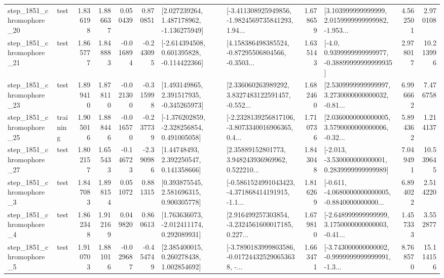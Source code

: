 \begin{tabular}{llrrrrllrlrr}
 step\_1851\_chromophore\_20 &      test &      1.836198 &    1.886637 &      0.050439 &  0.870851 &    [2.027239264, 1.487178962, -1.136275949] &  [-3.411308925949856, -1.9824569735841293, 1.94... &       1.678659 &  [3.103999999999999, 2.0159999999999982, -1.953... &            4.562501 &          2.970108 \\
 step\_1851\_chromophore\_21 &      test &      1.865777 &    1.848883 &     -0.016894 & -0.243095 &   [-2.614394508, 0.601395828, -0.114422366] &  [4.158386498385524, -0.87295506804566, -0.3503... &       1.635143 &   [-4.0, 0.9399999999999977, -0.38899999999999935] &            2.978017 &         10.213996 \\
 step\_1851\_chromophore\_23 &      test &      1.899410 &    1.878110 &     -0.021300 & -0.315998 &    [1.493149865, 2.391517935, -0.345265973] &  [2.336060263989292, 3.8327483122591457, -0.552... &       1.682460 &  [2.5309999999999997, 3.2730000000000032, -0.81... &            6.996662 &          7.476758 \\
 step\_1851\_chromophore\_25 &  training &      1.905016 &    1.888446 &     -0.016570 & -0.237739 &   [-1.376202859, -2.328256854, 0.491005058] &  [-2.2328139256817106, -3.8073340016906365, 0.4... &       1.710736 &  [2.0360000000000005, 3.5790000000000006, -0.32... &            5.894362 &          1.214137 \\
 step\_1851\_chromophore\_27 &      test &      1.802157 &    1.655433 &     -0.146723 & -2.390986 &      [1.44748493, 2.392250547, 0.141358666] &  [2.35889152801773, 3.948243936969962, 0.522210... &       1.843048 &   [-2.013, -3.530000000000001, 0.2839999999999989] &            7.049491 &         10.539645 \\
  step\_1851\_chromophore\_3 &      test &      1.847083 &    1.898154 &      0.051072 &  0.881315 &     [0.393875545, 2.581696315, 0.900305778] &  [-0.5861524991043423, -4.371868414191915, -1.1... &       1.816269 &  [-0.611, -4.0680000000000005, -0.8840000000000... &            6.894022 &          2.514220 \\
  step\_1851\_chromophore\_4 &      test &      1.862348 &    1.912169 &      0.049820 &  0.860613 &    [1.763636073, -2.012411174, 0.292089931] &  [2.916499257303854, -3.2324561600017185, 0.227... &       1.679810 &  [-2.648999999999999, 3.1750000000000003, -0.41... &            1.457333 &          3.552877 \\
  step\_1851\_chromophore\_5 &      test &      1.910703 &    1.881016 &     -0.029687 & -0.454749 &     [2.385400015, 0.260278438, 1.002854692] &  [-3.7890183999803586, -0.017244325290653638, -... &       1.663471 &  [-3.743000000000002, -0.9999999999999991, -1.3... &            8.768570 &         15.114156 \\

\end{tabular}
